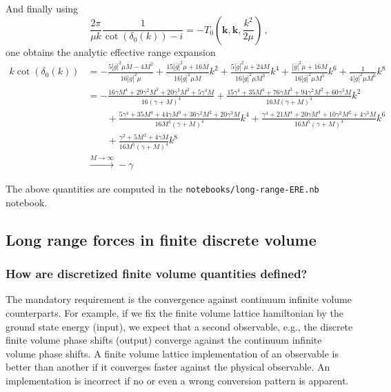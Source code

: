 \documentclass[
    aps,
    prl,
    showkeys,
    nofootinbib,
    floatfix
]{revtex4-1}
\renewcommand{\vec}[1]{\boldsymbol{#1}}
\begin{document}
And finally using 
\begin{equation}
	\frac{2 \pi}{ \mu k } \frac{1}{\cot(\delta_0(k)) - i} = - T_0\left(\vec k, \vec k, \frac{k^2}{2 \mu} \right) \, ,
\end{equation}
one obtains the analytic effective range expansion
\begin{align}
	k \cot( \delta_0(k))
	&=
	-\frac{5 |\bar g|^2 \mu  M-4 M^2}{16 |\bar g|^2 \mu }
	+\frac{15 |\bar g|^2 \mu + 16 M}{16 |\bar g|^2 \mu M}k^2
	+\frac{5 |\bar g|^2 \mu + 24 M}{16 |\bar g|^2\mu  M^3}k^4
	+\frac{|\bar g|^2 \mu + 16 M}{16|\bar g|^2 \mu  M^5}k^6
	+\frac{1}{4 |\bar g|^2 \mu  M^6}k^8
	\\
	&=
	-\frac{16\gamma  M^4+29 \gamma ^2 M^3+20 \gamma ^3 M^2+5 \gamma ^4 M}{16 (\gamma +M)^4}
	+\frac{15 \gamma ^4+35 M^4+76\gamma  M^3+94 \gamma ^2 M^2+60 \gamma ^3 M}{16 M (\gamma +M)^4}k^2
	\\\nonumber&\qquad
	+\frac{5 \gamma ^4+35 M^4+44 \gamma  M^3+36 \gamma ^2 M^2+20\gamma ^3 M}{16 M^3 (\gamma +M)^4}k^4
	+\frac{\gamma ^4+21 M^4+20 \gamma  M^3+10 \gamma ^2 M^2+4 \gamma ^3 M}{16 M^5(\gamma +M)^4}k^6
	\\\nonumber&\qquad
	+ \frac{\gamma ^2+5 M^2+4 \gamma  M}{16 M^5 (\gamma +M)^4}k^8 
	\\&\overset{M\to\infty}{\longrightarrow}-\gamma
\end{align}

The above quantities are computed in the \texttt{notebooks/long-range-ERE.nb} notebook.

\subsection{Long range forces in finite discrete volume}

\subsubsection{How are discretized finite volume quantities defined?}

The mandatory requirement is the convergence against continuum infinite volume counterparts.
For example, if we fix the finite volume lattice hamiltonian by the ground state energy (input), we expect that a second observable, e.g., the discrete finite volume phase shifts (output) converge against the continuum infinite volume phase shifts.
A finite volume lattice implementation of an observable is better than another if it converges faster against the physical observable.
An implementation is incorrect if no or even a wrong conversion pattern is apparent.
\end{document}

